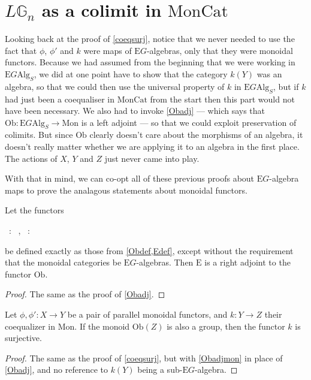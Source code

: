 \section{$L\mathbb{G}_n$ as a colimit in $\mathrm{MonCat}$}

Looking back at the proof of \cref{coeqsurj}, notice that we never needed to use the fact that $\phi$, $\phi'$ and $k$ were maps of $\mathrm{E}G$-algebras, only that they were monoidal functors. Because we had assumed from the beginning that we were working in $\mathrm{E}G\mathrm{Alg}_S$, we did at one point have to show that the category $k(Y)$ was an algebra, so that we could then use the universal property of $k$ in $\mathrm{E}G\mathrm{Alg}_S$, but if $k$ had just been a coequaliser in $\mathrm{MonCat}$ from the start then this part would not have been necessary. We also had to invoke \cref{Obadj} --- which says that $\mathrm{Ob}: \mathrm{E}G\mathrm{Alg}_S \to \mathrm{Mon}$ is a left adjoint --- so that we could exploit preservation of colimits. But since $\mathrm{Ob}$ clearly doesn't care about the morphisms of an algebra, it doesn't really matter whether we are applying it to an algebra in the first place. The actions of $X$, $Y$ and $Z$ just never came into play.

With that in mind, we can co-opt all of these previous proofs about $\mathrm{E}G$-algebra maps to prove the analagous statements about monoidal functors.

\begin{prop}\label{Obadjmon} Let the functors 
\begin{eq*}  \, : \,  \to {}, \quad \quad \quad {} \, : \,  \to {} \end{eq*}
be defined exactly as those from \cref{Obdef,Edef}, except without the requirement that the monoidal categories be $\mathrm{E}G$-algebras. Then $\mathrm{E}$ is a right adjoint to the functor $\mathrm{Ob}$. 
\end{prop}
\begin{proof}
The same as the proof of \cref{Obadj}.
\end{proof}

\begin{prop} \label{coeqsurjmon} Let $\phi, \phi' : X \to Y$ be a pair of parallel monoidal functors, and $k: Y \to Z$ their coequalizer in $\mathrm{Mon}$. If the monoid $\mathrm{Ob}(Z)$ is also a group, then the functor $k$ is surjective.
\end{prop}
\begin{proof}
The same as the proof of \cref{coeqsurj}, but with \cref{Obadjmon} in place of \cref{Obadj}, and no reference to $k(Y)$ being a sub-$\mathrm{E}G$-algebra.
\end{proof}

